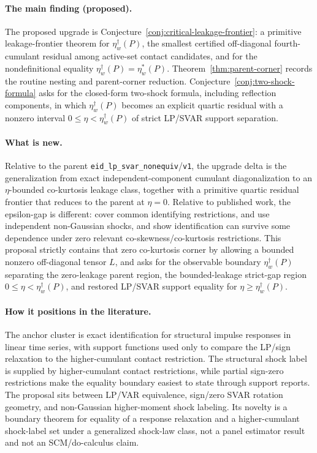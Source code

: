 \documentclass[11pt]{article}
\theoremstyle{definition}
\theoremstyle{plain}
\theoremstyle{remark}
\begin{document}
\paragraph{The main finding (proposed).}
The proposed upgrade is Conjecture~\ref{conj:critical-leakage-frontier}: a primitive leakage-frontier theorem for \(\eta_w^\dagger(P)\), the smallest certified off-diagonal fourth-cumulant residual among active-set contact candidates, and for the nondefinitional equality \(\eta_w^\dagger(P)=\eta_w^*(P)\).  Theorem~\ref{thm:parent-corner} records the routine nesting and parent-corner reduction.  Conjecture~\ref{conj:two-shock-formula} asks for the closed-form two-shock formula, including reflection components, in which \(\eta_w^\dagger(P)\) becomes an explicit quartic residual with a nonzero interval \(0\le\eta<\eta_w^\dagger(P)\) of strict LP/SVAR support separation.

\paragraph{What is new.}
Relative to the parent \texttt{eid\_lp\_svar\_nonequiv}/\texttt{v1}, the upgrade delta is the generalization from exact independent-component cumulant diagonalization to an \(\eta\)-bounded co-kurtosis leakage class, together with a primitive quartic residual frontier that reduces to the parent at \(\eta=0\).  Relative to published work, the epsilon-gap is different: \citet{PlagborgMollerWolf2021} cover common identifying restrictions, \citet{GourierouxMonfortRenne2017} and \citet{LanneMeitzSaikkonen2017} use independent non-Gaussian shocks, and \citet{LanneLiuLuoto2026} show identification can survive some dependence under zero relevant co-skewness/co-kurtosis restrictions.  This proposal strictly contains that zero co-kurtosis corner by allowing a bounded nonzero off-diagonal tensor \(L\), and asks for the observable boundary \(\eta_w^\dagger(P)\) separating the zero-leakage parent region, the bounded-leakage strict-gap region \(0\le\eta<\eta_w^\dagger(P)\), and restored LP/SVAR support equality for \(\eta\ge\eta_w^\dagger(P)\).

\paragraph{How it positions in the literature.}
The anchor cluster is exact identification for structural impulse responses in linear time series, with support functions used only to compare the LP/sign relaxation to the higher-cumulant contact restriction.  The structural shock label is supplied by higher-cumulant contact restrictions, while partial sign-zero restrictions make the equality boundary easiest to state through support reports.  The proposal sits between LP/VAR equivalence, sign/zero SVAR rotation geometry, and non-Gaussian higher-moment shock labeling.  Its novelty is a boundary theorem for equality of a response relaxation and a higher-cumulant shock-label set under a generalized shock-law class, not a panel estimator result and not an SCM/do-calculus claim.
\end{document}
